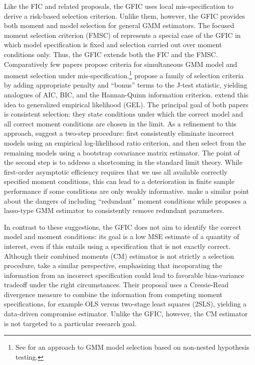 Like the FIC and related proposals, the GFIC uses local mis-specification to derive a risk-based selection criterion.
Unlike them, however, the GFIC provides both moment and model selection for general GMM estimators. 
The focused moment selection criterion (FMSC) of \cite{DiTraglia2016} represents a special case of the GFIC in which model specification is fixed and selection carried out over moment conditions only. 
Thus, the GFIC extends both the FIC and the FMSC.
Comparatively few papers propose criteria for simultaneous GMM model and moment selection under mis-specification.\footnote{See \cite{Smith1992} for an approach to GMM model selection based on non-nested hypothesis testing.} \cite{AndrewsLu} propose a family of selection criteria by adding appropriate penalty and ``bonus'' terms to the J-test statistic, yielding analogues of AIC, BIC, and the Hannan-Quinn information criterion.
\cite{HongPrestonShum} extend this idea to generalized empirical likelihood (GEL). 
The principal goal of both papers is consistent selection: they state conditions under which the correct model and all correct moment conditions are chosen in the limit. 
As a refinement to this approach, \cite{LaiSmallLiu} suggest a two-step procedure: first consistently eliminate incorrect models using an empirical log-likelihood ratio criterion, and then select from the remaining models using a bootstrap covariance matrix estimator. 
The point of the second step is to address a shortcoming in the standard limit theory. 
While first-order asymptotic efficiency requires that we use all available correctly specified moment conditions, this can lead to a deterioration in finite sample performance if some conditions are only weakly informative.
\cite{HallPeixe2003} make a similar point about the dangers of including ``redundant'' moment conditions while \cite{Caner2009} proposes a lasso-type GMM estimator to consistently remove redundant parameters.


In contrast to these suggestions, the GFIC does not aim to identify the correct model and moment conditions: its goal is a low MSE estimate of a quantity of interest, even if this entails using a specification that is not exactly correct.  
Although their combined moments (CM) estimator is not strictly a selection procedure, \cite{JudgeMittelhammer} take a similar perspective, emphasizing that incoporating the information from an incorrect specification could lead to favorable bias-variance tradeoff under the right circumstances. 
Their proposal uses a Cressie-Read divergence measure to combine the information from competing moment specifications, for example OLS versus two-stage least squares (2SLS), yielding a data-driven compromise estimator. 
Unlike the GFIC, however, the CM estimator is not targeted to a particular research goal.

